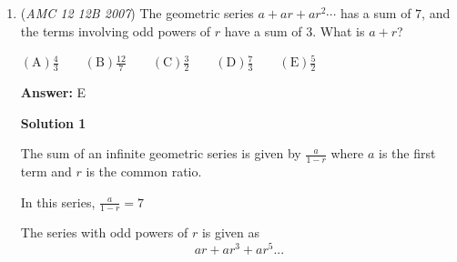 \begin{enumerate}
 
 \[s = \boxed{\mathrm{(D) \ } 4\sqrt{3}}\]

            \begin{itemize}
        \item Note - This is called \href{https://artofproblemsolving.com/wiki/index.php?title=Viviani\%27s\_Theorem}{Viviani's Theorem}.
            \end{itemize}
            



\textbf{Solution 2}

The 60 degree angles suggest constructing 30-60-90 triangles. As such, let the foot of the altitude from $Q$ to $\overline{BC}$ be $D$. Also, since $\angle{PQD}=60$, let the foot of the altitude from $P$ to $\overline{QD}$ be $E$. Since $\triangle{QEP}$ is 30-60-90, and $PQ=1$, $QE=\frac{1}{2}$. Also, since $PR=2$, $DE=2$. Thus, $QD=\frac{5}{2}$. Once again, since $\triangle{QBD}$ is 30-60-90, $QB=\frac{5\sqrt{3}}{3}$. Similar reasoning to $\overline{AQ}$ and summing the segments yields $\boxed{(D) 4\sqrt{3}}$




\textbf{Solution 3 (Viviani's Theorem)}

According to Viviani's Theorem, in an equilateral triangle, the sum of the perpendicular distances from a point inside the triangle will equal the altitude of the triangle. Thus, the height of the triangle is 6. 

 Then we start to form a 30-60-90 triangle. By that, we divide $6/\sqrt{3} = 2\sqrt{3}$ then multiply 2, and we get an answer of $\boxed{(D) 4\sqrt{3}}$



	\item (\textit{AMC 12 12B 2007}) The geometric series $a+ar+ar^2\cdots$ has a sum of $7$, and the terms involving odd powers of $r$ have a sum of $3$. What is $a+r$?


 $\mathrm {(A)} \frac{4}{3}\qquad \mathrm {(B)} \frac{12}{7}\qquad \mathrm {(C)} \frac{3}{2}\qquad \mathrm {(D)} \frac{7}{3}\qquad \mathrm {(E)} \frac{5}{2}$

 \textbf{Answer: }E



\textbf{Solution 1}

The sum of an infinite geometric series is given by $\frac{a}{1-r}$ where $a$ is the first term and $r$ is the common ratio.

 In this series, $\frac{a}{1-r} = 7$

 The series with odd powers of $r$ is given as 
 \[ar + ar^3 + ar^5 ...\]


\end{enumerate}
